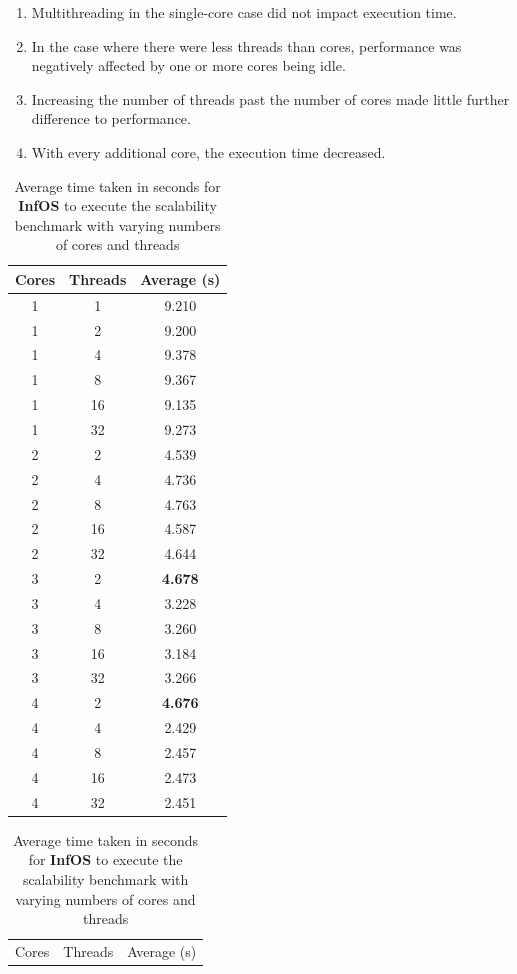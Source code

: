 \documentclass[bsc,frontabs,singlespacing,parskip,deptreport]{infthesis}
\begin{document}
\begin{enumerate}
    \item Multithreading in the single-core case did not impact execution time.
    \item In the case where there were less threads than cores, performance was negatively affected by one or more cores being idle.
    \item Increasing the number of threads past the number of cores made little further difference to performance.
    \item With every additional core, the execution time decreased.
\end{enumerate}

\begin{table}[h]
\parbox{.45\linewidth}{
\centering
\small
\begin{tabular}{ccc}
\toprule
Cores &Threads &Average (s) \\
\midrule
1 &1 &9.210 \\
\midrule
1 &2 &9.200 \\
1 &4 &9.378 \\
1 &8 &9.367 \\
1 &16 &9.135 \\
1 &32 &9.273 \\
\midrule
2 &2 &4.539 \\
2 &4 &4.736 \\
2 &8 &4.763 \\
2 &16 &4.587 \\
2 &32 &4.644 \\
\midrule
3 &2 &\textbf{4.678} \\
3 &4 &3.228 \\
3 &8 &3.260 \\
3 &16 &3.184 \\
3 &32 &3.266 \\
\midrule
4 &2 &\textbf{4.676} \\
4 &4 &2.429 \\
4 &8 &2.457 \\
4 &16 &2.473 \\
4 &32 &2.451 \\
\bottomrule
\end{tabular}
\caption{Average time taken in seconds for \textbf{InfOS} to execute the scalability benchmark with varying numbers of cores and threads}\label{timing-scalability-infos}
}
\hfill
\parbox{.45\linewidth}{
\centering
\small
\begin{tabular}{ccc}
\toprule
Cores &Threads &Average (s) \\

\end{tabular}}
\end{table}
\end{document}
